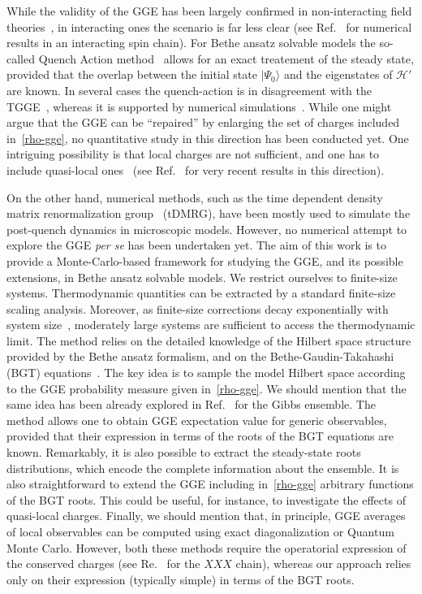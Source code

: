 \documentclass[twocolumn,superscriptaddress,prb,10pt]{revtex4-1}
\begin{document}
While the validity of the GGE has been largely confirmed in non-interacting field 
theories~\cite{calabrese-2011,calabrese-2012,fagotti-2013}, in interacting ones the 
scenario is far less clear (see Ref.~ for numerical results in an 
interacting spin chain). For Bethe ansatz solvable models the so-called Quench Action 
method~\cite{caux-2013} allows for an exact treatement of the steady state, 
provided that the overlap between the initial state $|\Psi_0\rangle$ and the eigenstates 
of ${\mathcal H}'$ are known. In several cases the quench-action is in disagreement with 
the TGGE~\cite{de-nardis-2014,pozsgay-2014,wouters-2014,mestyian-2015}, whereas it is 
supported by numerical simulations~\cite{pozsgay-2014}. While one might argue that the 
GGE can be ``repaired'' by enlarging the set of charges included in~\eqref{rho-gge}, 
no quantitative study in this direction has been conducted yet. One intriguing 
possibility is that local charges are not sufficient, and one has to include 
quasi-local ones~\cite{prosen-2014,pereira-2014,ilievski-2015} (see Ref.~ for very recent results in this direction). 

On the other hand, numerical methods, such as the time dependent density 
matrix renormalization group~\cite{white-2004,daley-2004} (tDMRG), have been mostly 
used to simulate the post-quench dynamics in microscopic models. However, no numerical 
attempt to explore the GGE {\it per se} has been undertaken yet. The aim of this work is to 
provide a Monte-Carlo-based framework for studying the GGE, and its possible extensions,   
in Bethe ansatz solvable models. We restrict ourselves to finite-size systems.  
Thermodynamic quantities can be extracted by a standard finite-size scaling analysis. 
Moreover, as finite-size corrections decay exponentially with system size~\cite{iyer-2015}, 
moderately large systems are sufficient to access the thermodynamic limit. 
The method relies on the detailed knowledge of the Hilbert space structure provided by 
the Bethe ansatz formalism, and on the Bethe-Gaudin-Takahashi (BGT) equations~\cite{takahashi-1971,
taka-book}. The key idea is to sample the model Hilbert space according to 
the GGE probability measure given in~\eqref{rho-gge}. We should mention that the same 
idea has been already explored in Ref.~ for the Gibbs ensemble.
The method allows one to obtain GGE expectation value for generic observables, provided 
that their expression in terms of the roots of the BGT equations are known. Remarkably, 
it is also possible to extract the steady-state roots distributions, which encode 
the complete information about the ensemble. It is also straightforward to extend 
the GGE including in~\eqref{rho-gge} arbitrary functions of the BGT roots. This could 
be useful, for instance, to investigate the effects of quasi-local charges. Finally, 
we should mention that, in principle, GGE averages of local observables can be computed 
using exact diagonalization or Quantum Monte Carlo. However, both these methods require 
the operatorial expression of the conserved charges (see Re.~ 
for the $XXX$ chain), whereas our approach relies only on their expression (typically simple) 
in terms of the BGT roots. 
\end{document}
